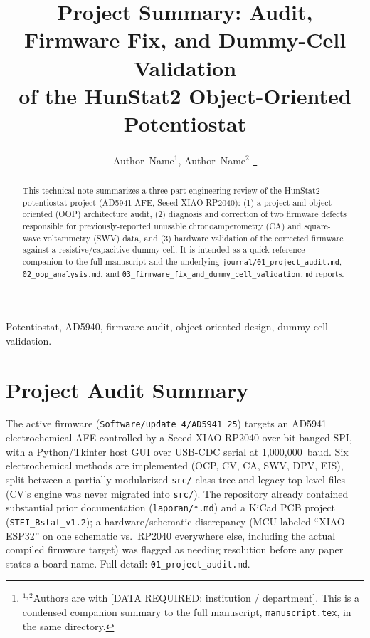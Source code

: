 \documentclass[journal]{IEEEtran}
\begin{document}
\title{Project Summary: Audit, Firmware Fix, and Dummy-Cell Validation\\ of the HunStat2 Object-Oriented Potentiostat}

\author{Author~Name$^{1}$, Author~Name$^{2}$
\thanks{$^{1,2}$Authors are with [DATA REQUIRED: institution / department]. This is a condensed companion summary to the full manuscript, \texttt{manuscript.tex}, in the same directory.}}

\maketitle

\begin{abstract}
This technical note summarizes a three-part engineering review of the HunStat2 potentiostat project (AD5941 AFE, Seeed XIAO RP2040): (1) a project and object-oriented (OOP) architecture audit, (2) diagnosis and correction of two firmware defects responsible for previously-reported unusable chronoamperometry (CA) and square-wave voltammetry (SWV) data, and (3) hardware validation of the corrected firmware against a resistive/capacitive dummy cell. It is intended as a quick-reference companion to the full manuscript and the underlying \texttt{journal/01\_project\_audit.md}, \texttt{02\_oop\_analysis.md}, and \texttt{03\_firmware\_fix\_and\_dummy\_cell\_validation.md} reports.
\end{abstract}

\begin{IEEEkeywords}
Potentiostat, AD5940, firmware audit, object-oriented design, dummy-cell validation.
\end{IEEEkeywords}

\section{Project Audit Summary}
The active firmware (\texttt{Software/update~4/AD5941\_25}) targets an AD5941 electrochemical AFE controlled by a Seeed XIAO RP2040 over bit-banged SPI, with a Python/Tkinter host GUI over USB-CDC serial at 1{,}000{,}000~baud. Six electrochemical methods are implemented (OCP, CV, CA, SWV, DPV, EIS), split between a partially-modularized \texttt{src/} class tree and legacy top-level files (CV's engine was never migrated into \texttt{src/}). The repository already contained substantial prior documentation (\texttt{laporan/*.md}) and a KiCad PCB project (\texttt{STEI\_Bstat\_v1.2}); a hardware/schematic discrepancy (MCU labeled ``XIAO ESP32'' on one schematic vs.\ RP2040 everywhere else, including the actual compiled firmware target) was flagged as needing resolution before any paper states a board name. Full detail: \texttt{01\_project\_audit.md}.
\end{document}
